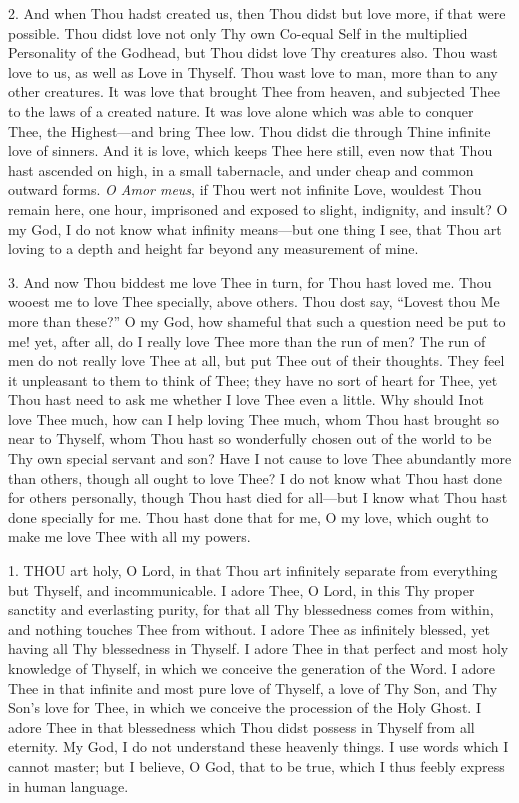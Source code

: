 2. And when Thou hadst created
us, then Thou didst but love more, if that were possible. Thou didst
love not only Thy own Co-equal Self in the multiplied Personality of the
Godhead, but Thou didst love Thy creatures also. Thou wast love to us,
as well as Love in Thyself. Thou wast love to man, more than to
any other creatures. It was love that brought Thee from heaven, and
subjected Thee to the laws of a created nature. It was love alone which
was able to conquer Thee, the Highest—and bring Thee low. Thou didst
die through Thine infinite love of sinners. And it is love, which keeps
Thee here still, even now that Thou hast ascended on high, in a small
tabernacle, and under cheap and common outward forms. \emph{O Amor meus},
if Thou wert not infinite Love, wouldest Thou remain here, one hour,
imprisoned and exposed to slight, indignity, and insult? O my God, I do
not know what infinity means—but one thing I see, that Thou art loving
to a depth and height far beyond any measurement of mine.

3. And now Thou biddest me love
Thee in turn, for Thou hast loved me. Thou wooest me to love Thee
specially, above others. Thou dost say, ``Lovest thou Me more than these?''
O my God, how shameful that such a question need be put to me! yet,
after all, do I really love Thee more than the run of men? The run of
men do not really love Thee at all, but put Thee out of their thoughts.
They feel it unpleasant to them to think of Thee; they have no sort of
heart for Thee, yet Thou hast need to ask me whether I love Thee even a
little. Why should I\emph{}not love Thee much, how can I help loving
Thee much, whom Thou hast brought so near to Thyself, whom Thou hast so
wonderfully chosen out of the world to be Thy own special servant and
son? Have I not cause to love Thee abundantly more than others, though
all ought to love Thee? I do not know what Thou hast done for
others personally, though Thou hast died for all—but I know what Thou
hast done specially for me. Thou hast done that for me, O my love, which
ought to make me love Thee with all my powers.


1. THOU
art holy, O Lord, in that Thou art infinitely separate from everything
but Thyself, and incommunicable. I adore Thee, O Lord, in this Thy
proper sanctity and everlasting purity, for that all Thy blessedness
comes from within, and nothing touches Thee from without. I adore Thee
as infinitely blessed, yet having all Thy blessedness in Thyself. I
adore Thee in that perfect and most holy knowledge of Thyself, in which
we conceive the generation of the Word. I adore Thee in that infinite
and most pure love of Thyself, a love of Thy Son, and Thy Son's love for
Thee, in which we conceive the procession of the Holy Ghost. I adore
Thee in that blessedness which Thou didst possess in Thyself from all
eternity. My God, I do not understand these heavenly things. I use words
which I cannot master; but I believe, O God, that to be true, which I
thus feebly express in human language.

